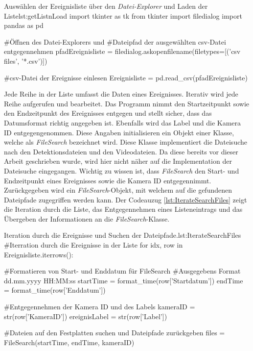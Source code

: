 \begin{pythoncode}{Auswählen der Ereignisliste über den \textit{Datei-Explorer} und Laden der Liste}{lst:getListnLoad}
import tkinter as tk
from tkinter import filedialog
import pandas as pd

#Öffnen des Datei-Explorers und 
#Dateipfad der ausgewählten csv-Datei entgegennehmen 
pfadEreignisliste = filedialog.askopenfilename(filetypes=[('csv files', '*.csv')])   

#csv-Datei der Ereignisse einlesen  
Ereignisliste = pd.read_csv(pfadEreignisliste)
\end{pythoncode}

Jede Reihe in der Liste umfasst die Daten eines Ereignisses. Iterativ wird jede Reihe aufgerufen und bearbeitet. Das Programm nimmt den Startzeitpunkt sowie den Endzeitpunkt des Ereignisses entgegen und stellt sicher, dass das Datumsformat richtig angegeben ist. Ebenfalls wird das Label und die Kamera ID entgegengenommen. Diese Angaben initialisieren ein Objekt einer Klasse, welche als \textit{FileSearch} bezeichnet wird. Diese Klasse implementiert die Dateisuche nach den Detektionsdateien und den Videodateien. Da diese bereits vor dieser Arbeit geschrieben wurde, wird hier nicht näher auf die Implementation der Dateisuche eingegangen. Wichtig zu wissen ist, dass \textit{FileSearch} den Start- und Endzeitpunkt eines Ereignisses sowie die Kamera ID entgegennimmt. Zurückgegeben wird ein \textit{FileSearch}-Objekt, mit welchem auf die gefundenen Dateipfade zugegriffen werden kann. Der Codeauzug \ref{lst:IterateSearchFiles} zeigt die Iteration durch die Liste, das Entgegennehmen eines Listeneintrags und das Übergeben der Informationen an die \textit{FileSearch}-Klasse.

\begin{pythoncode}{Iteration durch die Ereignisse und Suchen der Dateipfade.}{lst:IterateSearchFiles}
#Iterration durch die Ereignisse in der Liste
for idx, row in Ereignisliste.iterrows():  
    
    #Formatieren von  Start- und Enddatum für FileSearch
    #Ausgegebens Format dd.mm.yyyy HH:MM:ss
    startTime = format_time(row['Startdatum'])
    endTime = format_time(row['Enddatum'])

    #Entgegennehmen der Kamera ID und des Labels
    kameraID = str(row['KameraID'])
    ereignisLabel = str(row['Label'])

    #Dateien auf den Festplatten suchen und Dateipfade zurückgeben 
    files = FileSearch(startTime, endTime, kameraID)
\end{pythoncode}

